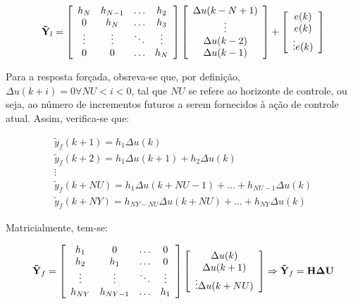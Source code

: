 \begin{equation}\label{eq:resp_livre_mat}
\mathbf{\tilde{Y}}_l = 
\left[
    \begin{array}{cccc}
        h_N & h_{N-1} & \ldots & h_2\\
        0 & h_N & \ldots & h_3\\
        \vdots & \vdots & \ddots & \vdots\\
        0 & 0 & \ldots & h_N
    \end{array}
\right]
\left[
    \begin{array}{c}
        \Delta u(k-N+1)\\
        \vdots\\
        \Delta u(k-2)\\
        \Delta u(k-1)
    \end{array}
\right]
+
\left[
    \begin{array}{c}
        e(k)\\
        e(k)\\
        \vdots
        e(k)
    \end{array}
\right]
\end{equation}

Para a resposta forçada, obsreva-se que, por definição, $\Delta u(k+i) = 0
\forall NU < i < 0$, tal que $NU$ se refere ao horizonte de controle, ou seja,
ao número de incrementos futuros a serem fornecidos à ação de controle atual.
Assim, verifica-se que:

\begin{eqnarray}
\tilde{y}_f(k+1) = h_1\Delta u(k)\nonumber\\
\tilde{y}_f(k+2) = h_1\Delta u(k+1) + h_2\Delta u(k)\nonumber\\
\vdots\\
\tilde{y}_f(k+NU) = h_1\Delta u(k+NU-1) + \ldots + 
                    h_{NU-1}\Delta u(k)\nonumber\\
\tilde{y}_f(k+NY) = h_{NY-NU}\Delta u(k+NU) + \ldots + 
                    h_{NY}\Delta u(k)\nonumber
\end{eqnarray}

Matricialmente, tem-se:

\begin{equation}\label{eq:resp_forc_mat}
\mathbf{\tilde{Y}}_f = 
\left[
    \begin{array}{cccc}
        h_1 & 0 & \ldots & 0\\
        h_2 & h_1 & \ldots & 0\\
        \vdots & \vdots & \ddots & \vdots\\
        h_{NY} & h_{NY-1} & \ldots & h_1
    \end{array}
\right]
\left[
    \begin{array}{c}
        \Delta u(k)\\
        \Delta u(k+1)\\
        \vdots
        \Delta u(k+NU)\\
    \end{array}
\right]
\Rightarrow \mathbf{\tilde{Y}}_f = \mathbf{H\Delta U}
\end{equation}

